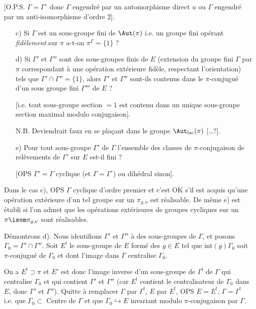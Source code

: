 [O.P.S. $\Gamma = \Gamma^\circ$ donc $\Gamma$ engendré par un automorphisme direct $u$ ou $\Gamma$ engendré par un anti-isomorphisme d'ordre 2].
\begin{enumerate}
    \item[c)] Si $\Gamma$ est un sous-groupe fini de $\Aut(\pi)$ i.e. un groupe fini opérant \emph{fidèlement} sur $\pi$ a-t-on $\pi^\Gamma = \{ 1 \}$ ?
    \item[d)] Si $\Gamma'$ et $\Gamma''$ sont des sous-groupes finis de $E$ (extension du groupe fini $\Gamma$ par $\pi$ correspondant à une opération extérieure fidèle, respectant l'orientation) tels que $\Gamma' \cap \Gamma'' = \{ 1 \}$, alors $\Gamma'$ et $\Gamma''$ sont-ils contenus dans le $\pi$-conjugué d'un sous groupe fini $\Gamma'''$ de $E$ ?
    
    [i.e. tout sous-groupe section $= 1$ est contenu dans un unique sous-groupe section maximal modulo conjugaison].
    
    N.B. Deviendrait faux en se pla\c{c}ant dans le groupe $\Aut_{\text{lac}}(\pi)$ [\dots?].
    \item[e)] Pour tout sous-groupe $\Gamma'$ de $\Gamma$ l'ensemble des classes de $\pi$-conjugaison de relèvements de $\Gamma'$ sur $E$ est-il fini ?
    
    [OPS $\Gamma' = \Gamma$ cyclique (et $\Gamma = \Gamma^\circ$) ou dihédral sinon].
\end{enumerate}
Dans le cas c), OPS $\Gamma$ cyclique d'ordre premier et c'est OK s'il est acquis qu'une opération extérieure d'un tel groupe sur un $\pi_{g, \nu}$ est réalisable. De même e) est établi si l'on admet que les opérations extérieures de groupes cycliques sur un $\pi \isom \pi_{g, \nu}$ sont réalisables.

Démontrons d). Nous identifions $\Gamma'$ et $\Gamma''$ à des sous-groupes de $\Gamma$, et posons $\Gamma_0 = \Gamma' \cap \Gamma''$. Soit $E^!$ le sous-groupe de $E$ formé des $g \in E$ tel que int$(g) \Gamma_0$ soit $\pi$-conjugué de $\Gamma_0$ et dont l'image dans $\Gamma$ centralise $\Gamma_0$.

On a $E^! \supset \pi$ et $E'$ est donc l'image inverse d'un sous-groupe de $\Gamma^!$ de $\Gamma$ qui centralise $\Gamma_0$ et qui contient $\Gamma'$ et $\Gamma''$ (car $E^!$ contient le centralisateur de $\Gamma_0$ dans $E$, donc $\Gamma'$ et $\Gamma''$). Quitte à remplacer $\Gamma$ par $\Gamma^!$, $E$ par $E^!$, OPS $E = E^!$, $\Gamma = \Gamma^!$ i.e. que $\Gamma_0 \subset $ Centre de $\Gamma$ et que $\Gamma_0 \hookrightarrow E$ invariant modulo $\pi$-conjugaison par $\Gamma$.

